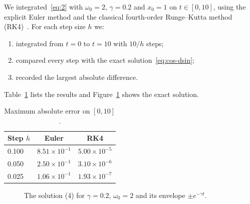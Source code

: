 \documentclass[11pt,a4paper]{article}
\begin{document}
We integrated~\eqref{eq:2} with $\omega_{0}=2$, $\gamma=0.2$ and $x_{0}=1$ on $t\in[0,10]$, using the explicit Euler method and the classical fourth-order Runge--Kutta method (RK4)~\cite{ref3}. For each step size $h$ we:
\begin{enumerate}
  \item integrated from $t=0$ to $t=10$ with $10/h$ steps;
  \item compared every step with the exact solution~\eqref{eq:cos-dsin};
  \item recorded the largest absolute difference.
\end{enumerate}
Table~\ref{tab:results} lists the results and Figure~\ref{fig:solution} shows the exact solution.

\begin{table}[htbp]
  \centering
  \caption{Maximum absolute error on $[0,10]$.}
  \label{tab:results}
  \begin{tabular}{lcc}
    \toprule
    \textbf{Step $h$} & \textbf{Euler} & \textbf{RK4} \\
    \midrule
    0.100 & $8.51\times10^{-1}$ & $5.00\times10^{-5}$ \\
    0.050 & $2.50\times10^{-1}$ & $3.10\times10^{-6}$ \\
    0.025 & $1.06\times10^{-1}$ & $1.93\times10^{-7}$ \\
    \bottomrule
  \end{tabular}
\end{table}

\begin{figure}[htbp]
  \centering
  \caption{The solution (4) for $\gamma=0.2$, $\omega_{0}=2$ and its envelope $\pm e^{-\gamma t}$.}
  \label{fig:solution}
\end{figure}
\end{document}
